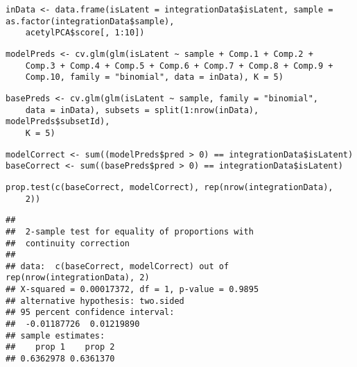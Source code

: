 \documentclass[../../sherrill-Mix_thesis.tex]{subfiles}
\makeatletter
\newenvironment{kframe}{%
 \def\at@end@of@kframe{}%
 \ifinner\ifhmode%
  \def\at@end@of@kframe{\end{minipage}}%
  \begin{minipage}{\columnwidth}%
 \fi\fi%
 \def\FrameCommand##1{\hskip\@totalleftmargin \hskip-\fboxsep
 \colorbox{shadecolor}{##1}\hskip-\fboxsep
     \hskip-\linewidth \hskip-\@totalleftmargin \hskip\columnwidth}%
 \MakeFramed {\advance\hsize-\width
   \@totalleftmargin\z@ \linewidth\hsize
   \@setminipage}}%
 {\par\unskip\endMakeFramed%
 \at@end@of@kframe}
\newenvironment{knitrout}{}{} %
\makeatother
\begin{document}
\begin{knitrout}
\begin{kframe}
\begin{lstlisting}[basicstyle=\ttfamily,breaklines=true]
\end{lstlisting}
\begin{lstlisting}[basicstyle=\ttfamily,breaklines=true]
inData <- data.frame(isLatent = integrationData$isLatent, sample = as.factor(integrationData$sample), 
    acetylPCA$score[, 1:10])\end{lstlisting}
\begin{lstlisting}[basicstyle=\ttfamily,breaklines=true]
modelPreds <- cv.glm(glm(isLatent ~ sample + Comp.1 + Comp.2 + 
    Comp.3 + Comp.4 + Comp.5 + Comp.6 + Comp.7 + Comp.8 + Comp.9 + 
    Comp.10, family = "binomial", data = inData), K = 5)\end{lstlisting}
\begin{lstlisting}[basicstyle=\ttfamily,breaklines=true]
basePreds <- cv.glm(glm(isLatent ~ sample, family = "binomial", 
    data = inData), subsets = split(1:nrow(inData), modelPreds$subsetId), 
    K = 5)\end{lstlisting}
\begin{lstlisting}[basicstyle=\ttfamily,breaklines=true]
modelCorrect <- sum((modelPreds$pred > 0) == integrationData$isLatent)
baseCorrect <- sum((basePreds$pred > 0) == integrationData$isLatent)\end{lstlisting}
\begin{lstlisting}[basicstyle=\ttfamily,breaklines=true]
prop.test(c(baseCorrect, modelCorrect), rep(nrow(integrationData), 
    2))\end{lstlisting}
\begin{lstlisting}[basicstyle=\ttfamily,breaklines=true]
## 
## 	2-sample test for equality of proportions with
## 	continuity correction
## 
## data:  c(baseCorrect, modelCorrect) out of rep(nrow(integrationData), 2)
## X-squared = 0.00017372, df = 1, p-value = 0.9895
## alternative hypothesis: two.sided
## 95 percent confidence interval:
##  -0.01187726  0.01219890
## sample estimates:
##    prop 1    prop 2 
## 0.6362978 0.6361370
\end{lstlisting}
\end{kframe}
\end{knitrout}
\end{document}
